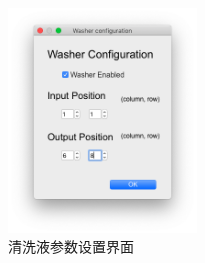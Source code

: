 \documentclass[12pt, a4paper]{article}
\begin{document}
\begin{appendices}
			\begin{figure}[htbp]
				\centering
				\includegraphics[width=5cm]{Img/washer.png}
				\caption{清洗液参数设置界面}
			\end{figure}
		\end{appendices}
\end{document}
